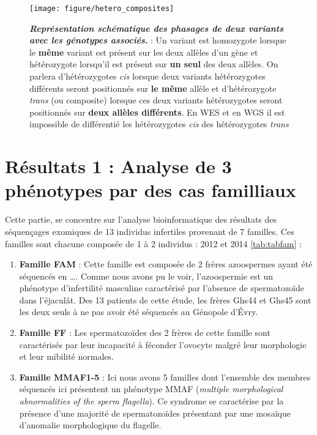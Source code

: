 \documentclass[12pt,twoside]{ugathesis}
\providecommand{\tightlist}{%
  \setlength{\itemsep}{0pt}\setlength{\parskip}{0pt}}
\begin{document}
\begin{figure}

{\centering \texttt{[image: figure/hetero\_composites]} 

}

\caption[Représentation schématique des phasages de deux variants avec les génotypes associés]{\textbf{\emph{Représentation schématique des
phasages de deux variants avec les génotypes associés}.} : Un variant
est homozygote lorsque le \textbf{même} variant est présent sur les deux
allèles d'un gène et hétérozygote lorsqu'il est présent sur \textbf{un
seul} des deux allèles. On parlera d'hétérozygotes \emph{cis} lorsque
deux variants hétérozygotes différents seront positionnés sur \textbf{le
même} allèle et d'hétérozygote \emph{trans} (ou composite) lorsque ces
deux variants hétérozygotes seront positionnés sur \textbf{deux allèles
différents}. En WES et en WGS il est impossible de différentié les
hétérozygotes \emph{cis} des hétérozygotes \emph{trans}}\label{fig:piccompositehet}
\end{figure}












\newpage

\section{Résultats 1 : Analyse de 3 phénotypes par des cas
familliaux}\label{resultats-1-analyse-de-3-phenotypes-par-des-cas-familliaux}

Cette partie, se concentre sur l'analyse bioinformatique des résultats
des séquençages exomiques de 13 individus infertiles provenant de 7
familles. Ces familles sont chacune composée de 1 à 2 individus : 2012
et 2014 \ref{tab:tabfam} :

\begin{enumerate}
\def\labelenumi{\arabic{enumi}.}
\tightlist
\item
  \textbf{Famille FAM} : Cette famille est composée de 2 frères
  azoospermes ayant été séquencés en \ldots{}. Comme nous avons pu le
  voir, l'azoospermie est un phénotype d'infertilité masculine
  caractérisé par l'absence de spermatozoïde dans l'éjaculât. Des 13
  patients de cette étude, les frères Ghs44 et Ghs45 sont les deux seuls
  à ne pas avoir été séquencés au Génopole d'Évry.\\
\item
  \textbf{Famille FF} : Les spermatozoïdes des 2 frères de cette famille
  sont caractérisés par leur incapacité à féconder l'ovocyte malgré leur
  morphologie et leur mibilité normales.\\
\item
  \textbf{Famille MMAF1-5} : Ici nous avons 5 familles dont l'ensemble
  des membres séquencés ici présentent un phénotype MMAF (\emph{multiple
  morphological abnormalities of the sperm flagella}). Ce syndrome se
  caractérise par la présence d'une majorité de spermatozoïdes
  présentant par une mosaïque d'anomalie morphologique du flagelle.
\end{enumerate}
\end{document}
